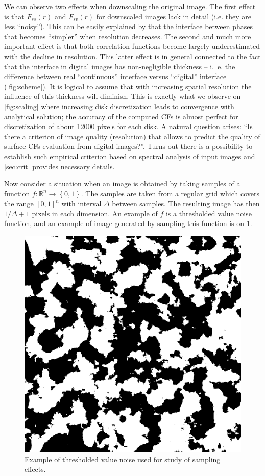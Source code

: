 \documentclass[reprint,amsmath,amssymb,aps,pre]{revtex4-1}
\begin{document}
We can observe two effects when downscaling the original image. The
first effect is that $F_{ss}(r)$ and $F_{sv}(r)$ for downscaled images lack in
detail (i.e. they are less ``noisy''). This can be easily explained by that the
interface between phases that becomes ``simpler'' when resolution decreases. The
second and much more important effect is that both correlation functions become
largely underestimated with the decline in resolution. This latter effect is in
general connected to the fact that the interface in digital images has
non-negligible thickness -- i.~e. the difference between real ``continuous''
interface versus ``digital'' interface (\cref{fig:scheme}). It is logical to
assume that with increasing spatial resolution the influence of this thickness
will diminish. This is exactly what we observe on \cref{fig:scaling} where
increasing disk discretization leads to convergence with analytical solution;
the accuracy of the computed CFs is almost perfect for discretization of about
12000 pixels for each disk. A natural question arises: ``Is there a criterion of
image quality (resolution) that allows to predict the quality of surface CFs
evaluation from digital images?''. Turns out there is a possibility to establish
such empirical criterion based on spectral analysis of input images and
\cref{sec:crit} provides necessary details.

Now consider a situation when an image is obtained by taking samples of a function
$f: \mathbb{R}^n \rightarrow \left\{0, 1\right\}$. The samples are taken from a
regular grid which covers the range $[0, 1]^n$  with interval $\Delta$ between
samples. The resulting image has then $1/\Delta + 1$ pixels in each
dimension. An example of $f$ is a thresholded value noise function, and an
example of image generated by sampling this function is on \cref{fig:noise}.

\begin{figure}[ht]
  \centering
  \includegraphics[width=0.9\linewidth]{images/noise.png}
  \caption[]{Example of thresholded value noise used for study of sampling
    effects.}
  \label{fig:noise}
\end{figure}
\end{document}
